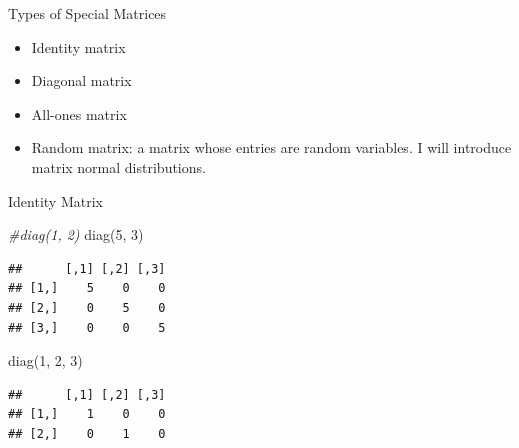 \documentclass[
  ignorenonframetext,
]{beamer}
\newenvironment{Shaded}{\begin{snugshade}}{\end{snugshade}}
\newcommand{\CommentTok}[1]{\textcolor[rgb]{0.56,0.35,0.01}{\textit{#1}}}
\newcommand{\DecValTok}[1]{\textcolor[rgb]{0.00,0.00,0.81}{#1}}
\newcommand{\FunctionTok}[1]{\textcolor[rgb]{0.00,0.00,0.00}{#1}}
\newcommand{\NormalTok}[1]{#1}
\providecommand{\tightlist}{%
  \setlength{\itemsep}{0pt}\setlength{\parskip}{0pt}}
\begin{document}
\begin{frame}{Types of Special Matrices}
\protect\hypertarget{types-of-special-matrices}{}
\begin{itemize}
\tightlist
\item
  Identity matrix
\item
  Diagonal matrix
\item
  All-ones matrix
\item
  Random matrix: a matrix whose entries are random variables. I will
  introduce matrix normal distributions.
\end{itemize}
\end{frame}

\begin{frame}[fragile]{Identity Matrix}
\protect\hypertarget{identity-matrix}{}
\begin{Shaded}
\begin{Highlighting}[]
\CommentTok{\#diag(1, 2)}
\FunctionTok{diag}\NormalTok{(}\DecValTok{5}\NormalTok{, }\DecValTok{3}\NormalTok{)}
\end{Highlighting}
\end{Shaded}

\begin{verbatim}
##      [,1] [,2] [,3]
## [1,]    5    0    0
## [2,]    0    5    0
## [3,]    0    0    5
\end{verbatim}

\begin{Shaded}
\begin{Highlighting}[]
\FunctionTok{diag}\NormalTok{(}\DecValTok{1}\NormalTok{, }\DecValTok{2}\NormalTok{, }\DecValTok{3}\NormalTok{)}
\end{Highlighting}
\end{Shaded}

\begin{verbatim}
##      [,1] [,2] [,3]
## [1,]    1    0    0
## [2,]    0    1    0
\end{verbatim}
\end{frame}
\end{document}
